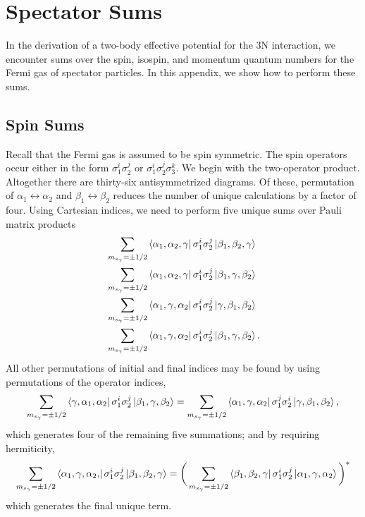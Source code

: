 \chapter{\label{app:sums}Spectator Sums}

In the derivation of a two-body effective potential for the 3N interaction, we encounter sums over the spin, isospin, and momentum quantum numbers for the Fermi gas of spectator particles. In this appendix, we show how to perform these sums.

\section{Spin Sums}
Recall that the Fermi gas is assumed to be spin symmetric. The spin operators occur either in the form $\sigma_1^i\sigma_2^j$ or $\sigma_1^i\sigma_2^j\sigma_3^k$. We begin with the two-operator product. Altogether there are thirty-six antisymmetrized diagrams. Of these, permutation of $\alpha_1\leftrightarrow \alpha_2$ and $\beta_1\leftrightarrow \beta_2$ reduces the number of unique calculations by a factor of four. Using Cartesian indices, we need to perform five unique sums over Pauli matrix products
\begin{align}
&\sum_{m_{s_\gamma}=\pm1/2} \bra{\alpha_1,\alpha_2, \gamma } \sigma_1^i\sigma_2^j \ket{\beta_1, \beta_2, \gamma} \label{eq:2sigma33}\\
&\sum_{m_{s_\gamma}=\pm1/2} \bra{\alpha_1,\alpha_2, \gamma } \sigma_1^i\sigma_2^j \ket{\beta_1,  \gamma, \beta_2 } \label{eq:2sigma32}\\
 &\sum_{m_{s_\gamma}=\pm1/2} \bra{\alpha_1, \gamma, \alpha_2 } \sigma_1^i\sigma_2^j \ket{\gamma, \beta_1, \beta_2 } \label{eq:2sigma21}\\
 &\sum_{m_{s_\gamma}=\pm1/2} \bra{\alpha_1, \gamma, \alpha_2 } \sigma_1^i\sigma_2^j \ket{\beta_1, \gamma, \beta_2 }. \label{eq:2sigma22}
\end{align}
All other permutations of initial and final indices may be found by using permutations of the operator indices, 
\begin{equation}
\sum_{m_{s_\gamma}=\pm1/2} \bra{ \gamma, \alpha_1, \alpha_2 } \sigma_1^i\sigma_2^j \ket{\beta_1, \gamma, \beta_2 } = \sum_{m_{s_\gamma}=\pm1/2} \bra{\alpha_1, \gamma, \alpha_2 } \sigma_1^j\sigma_2^i \ket{\gamma, \beta_1, \beta_2 },
\end{equation}
which generates four  of the remaining five summations; and by requiring hermiticity,
\begin{equation}
\sum_{m_{s_\gamma}=\pm1/2} \bra{\alpha_1, \gamma,\alpha_2, } \sigma_1^i\sigma_2^j \ket{\beta_1,  \beta_2, \gamma }=
\bigg(\sum_{m_{s_\gamma}=\pm1/2} \bra{\beta_1, \beta_2, \gamma } \sigma_1^i\sigma_2^j \ket{\alpha_1, \gamma, \alpha_2 }\bigg)^*
\end{equation}
which generates the final unique term.

